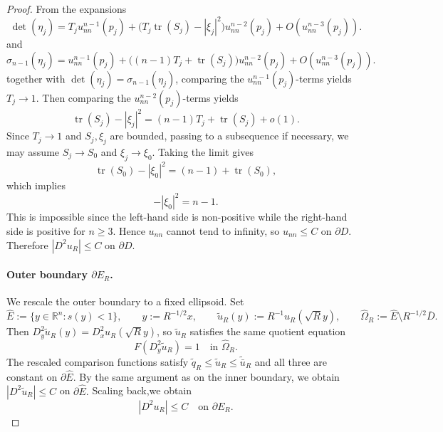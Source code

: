 \documentclass[10pt,a4paper]{amsart}
\begin{document}
\begin{proof}
		From the expansions
		\begin{equation}
			\det(\eta_j)
			=
			T_j u_{nn}^{n-1}(p_j)
			+
			\bigl(T_j\operatorname{tr}(S_j)-|\xi_j|^2\bigr)u_{nn}^{n-2}(p_j)
			+
			O(u_{nn}^{n-3}(p_j)).
		\end{equation}
		and
		\begin{equation}
			\sigma_{n-1}(\eta_j)
			=
			u_{nn}^{n-1}(p_j)
			+
			\bigl((n-1)T_j+\operatorname{tr}(S_j)\bigr)u_{nn}^{n-2}(p_j)
			+
			O(u_{nn}^{n-3}(p_j)).
		\end{equation}
		together with $\det(\eta_j)=\sigma_{n-1}(\eta_j)$, comparing the $u_{nn}^{n-1}(p_j)$-terms yields $T_j\to1$. Then comparing the $u_{nn}^{n-2}(p_j)$-terms yields
		\[
		\operatorname{tr}(S_j)-|\xi_j|^2 = (n-1)T_j+\operatorname{tr}(S_j)+o(1).
		\]
		Since $T_j\to1$ and $S_j,\xi_j$ are bounded, passing to a subsequence if necessary, we may assume $S_j\to S_0$ and $\xi_j\to\xi_0$. Taking the limit gives
		\[
		\operatorname{tr}(S_0)-|\xi_0|^2 = (n-1)+\operatorname{tr}(S_0),
		\]
		which implies
		\begin{equation}
			-|\xi_0|^2 = n-1.
		\end{equation}
		This is impossible since the left-hand side is non-positive while the right-hand side is positive for $n\ge3$. Hence $u_{nn}$ cannot tend to infinity, so $u_{nn}\le C$ on $\partial D$. Therefore $|D^2u_R|\le C$ on $\partial D$.
		\paragraph{Outer boundary $\partial E_R$.}
		We rescale the outer boundary to a fixed ellipsoid. Set
		\[
		\widehat{E} := \{ y \in \mathbb{R}^n : s(y) < 1 \}, \qquad y := R^{-1/2} x,
		\qquad \widetilde{u}_R(y) := R^{-1} u_R(\sqrt{R} y), \qquad \widehat{\Omega}_R := \widehat{E} \setminus R^{-1/2} \overline{D}.
		\]
		Then $D_y^2 \widetilde{u}_R(y) = D_x^2 u_R(\sqrt{R} y)$, so $\widetilde{u}_R$ satisfies the same quotient equation
		\[
		F(D_y^2 \widetilde{u}_R) = 1 \quad \text{in } \widehat{\Omega}_R.
		\]
		The rescaled comparison functions satisfy $\widetilde{q}_R \le \widetilde{u}_R \le \widetilde{\bar{u}}_R$ and all three are constant on $\partial \widehat{E}$. By the same argument as on the inner boundary, we obtain
		$|D^2 \widetilde{u}_R|\le C$ on $ \partial \widehat{E}.$
		Scaling back,we obtain
		\begin{equation}
			|D^2 u_R| \le C \quad \text{on } \partial E_R.
		\end{equation}
	\end{proof}
\end{document}
